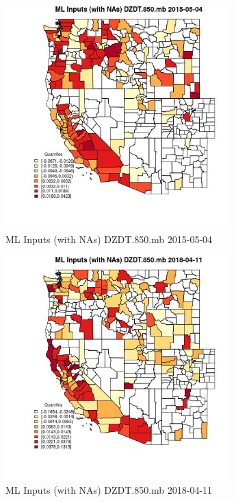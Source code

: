 \begin{figure} 
\centering  
\includegraphics[width=0.77\textwidth]{Code_Outputs/Report_ML_input_PM25_Step4_part_e_de_duplicated_aves_compiled_2019-05-18wNAs_CountyDZDT850mbMean2015-05-04_2015-05-04.jpg} 
\caption{\label{fig:Report_ML_input_PM25_Step4_part_e_de_duplicated_aves_compiled_2019-05-18wNAsCountyDZDT850mbMean2015-05-04_2015-05-04}ML Inputs (with NAs) DZDT.850.mb 2015-05-04} 
\end{figure} 
 

\begin{figure} 
\centering  
\includegraphics[width=0.77\textwidth]{Code_Outputs/Report_ML_input_PM25_Step4_part_e_de_duplicated_aves_compiled_2019-05-18wNAs_CountyDZDT850mbMean2018-04-11_2018-04-11.jpg} 
\caption{\label{fig:Report_ML_input_PM25_Step4_part_e_de_duplicated_aves_compiled_2019-05-18wNAsCountyDZDT850mbMean2018-04-11_2018-04-11}ML Inputs (with NAs) DZDT.850.mb 2018-04-11} 
\end{figure} 
 

